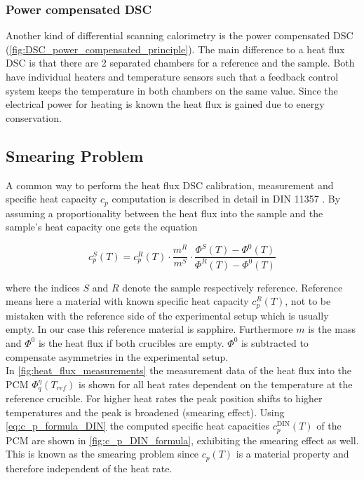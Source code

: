 \documentclass{scrartcl}[12pt, halfparskip]
\numberwithin{equation}{section}
\numberwithin{figure}{section}
\numberwithin{table}{section}
\begin{document}
\subsubsection{Power compensated DSC}
\label{sec:power_compensated_dsc}
Another kind of differential scanning calorimetry is the
power compensated DSC (\cref{fig:DSC_power_compensated_principle}). 
The main difference to a heat flux DSC is that there are 2 separated chambers for a reference and the sample. Both have individual heaters and temperature sensors such that a feedback control system keeps the temperature in both chambers on the same value. Since the electrical power for heating is known the heat flux is gained due to energy conservation. \\


\subsection{Smearing Problem}
\label{sec:smearing_problem}
A common way to perform the heat flux DSC calibration, measurement and specific heat capacity $c_p$ computation is described in detail in DIN 11357 \cite{DIN_11357}. By assuming a proportionality between the heat flux into the sample and the sample's heat capacity one gets the equation

\begin{equation}
	c_p^S(T) = c_p^{R}(T) \cdot \frac{m^R}{m^S} \cdot \frac{\varPhi^S(T) - \varPhi^0(T)}{\varPhi^R(T) - \varPhi^0(T)}
	\label{eq:c_p_formula_DIN}
\end{equation}

where the indices $S$ and $R$ denote the sample respectively reference. Reference means here a material with known specific heat capacity $c_p^R(T)$, not to be mistaken with the reference side of the experimental setup which is usually empty. In our case this reference material is sapphire. Furthermore $m$ is the mass and $\varPhi^0$ is the heat flux if both crucibles are empty. $\varPhi^0$ is subtracted to compensate asymmetries in the experimental setup. \\
In \cref{fig:heat_flux_measurements} the measurement data of the heat flux into the PCM $\varPhi_q^{\eta}(T_{ref})$ is shown for all heat rates dependent on the temperature at the reference crucible. For higher heat rates the peak position shifts to higher temperatures and the peak is broadened (smearing effect). Using \cref{eq:c_p_formula_DIN} the computed specific heat capacities $c_p^{\text{DIN}}(T)$ of the PCM are shown in \cref{fig:c_p_DIN_formula}, exhibiting the smearing effect as well. This is known as the smearing problem since $c_p(T)$ is a material property and therefore independent of the heat rate.
\end{document}

